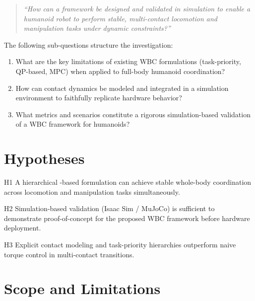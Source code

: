 \begin{quote}
  \textit{``How can a \WBC{} framework be designed and validated in simulation
  to enable a humanoid robot to perform stable, multi-contact locomotion and
  manipulation tasks under dynamic constraints?''}
\end{quote}


\noindent The following sub-questions structure the investigation:
\begin{enumerate}[label=\textbf{SQ\arabic*}]
  \item What are the key limitations of existing WBC formulations (task-priority,
        QP-based, MPC) when applied to full-body humanoid coordination?
  \item How can contact dynamics be modeled and integrated in a simulation
        environment to faithfully replicate hardware behavior?
  \item What metrics and scenarios constitute a rigorous simulation-based
        validation of a WBC framework for humanoids?
\end{enumerate}

\section{Hypotheses}
\label{sec:hypotheses}

\begin{hypothesis}{H1}
  A hierarchical \QP{}-based \WBC{} formulation can achieve stable whole-body
  coordination across locomotion and manipulation tasks simultaneously.
\end{hypothesis}

\begin{hypothesis}{H2}
  Simulation-based validation (Isaac Sim / MuJoCo) is sufficient to demonstrate
  proof-of-concept for the proposed WBC framework before hardware deployment.
\end{hypothesis}

\begin{hypothesis}{H3}
  Explicit contact modeling and task-priority hierarchies outperform naive
  torque control in multi-contact transitions.
\end{hypothesis}

\section{Scope and Limitations}
\label{sec:scope}

